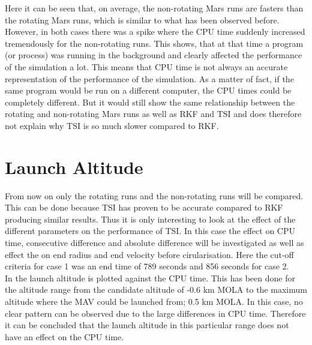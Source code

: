 \noindent
Here it can be seen that, on average, the non-rotating Mars runs are fasters than the rotating Mars runs, which is similar to what has been observed before. However, in both cases there was a spike where the CPU time suddenly increased tremendously for the non-rotating runs. This shows, that at that time a program (or process) was running in the background and clearly affected the performance of the simulation a lot. This means that CPU time is not always an accurate representation of the performance of the simulation. As a matter of fact, if the same program would be run on a different computer, the CPU times could be completely different. But it would still show the same relationship between the rotating and non-rotating Mars runs as well as \ac{RKF} and \ac{TSI} and does therefore not explain why \ac{TSI} is so much slower compared to \ac{RKF}.




\section{Launch Altitude}
\label{sec:launchAltitude}
From now on only the rotating runs and the non-rotating runs will be compared. This can be done because \ac{TSI} has proven to be accurate compared to \ac{RKF} producing similar results. Thus it is only interesting to look at the effect of the different parameters on the performance of \ac{TSI}. In this case the effect on CPU time, consecutive difference and absolute difference will be investigated as well as effect the on end radius and end velocity before cirularisation. Here the cut-off criteria for case 1 was an end time of 789 seconds and 856 seconds for case 2.\\

\noindent
In  the launch altitude is plotted against the CPU time. This has been done for the altitude range from the candidate altitude of -0.6 km \ac{MOLA} to the maximum altitude where the \ac{MAV} could be launched from; 0.5 km \ac{MOLA}. In this case, no clear pattern can be observed due to the large differences in CPU time. Therefore it can be concluded that the launch altitude in this particular range does not have an effect on the CPU time.


